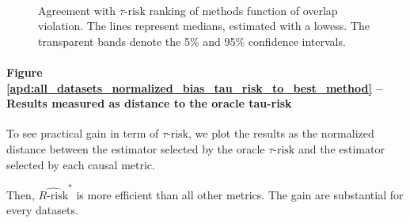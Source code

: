 \documentclass[french,12pt,twoside,a4paper]{book}
\begin{document}
\begin{appendices}
\begin{figure}
    \hfill
    \begin{subfigure}[b]{0.10\textwidth}
      ~
    \end{subfigure}
    \caption{Agreement with $\tau\text{-risk}$ ranking of methods function
      of overlap violation. The lines represent medians, estimated with a
      lowess. The transparent
      bands denote the 5\% and 95\% confidence intervals.}\label{apd:fig:all_datasets_tau_risk_ranking_agreement}
  \end{figure}



  \paragraph{Figure \ref{apd:all_datasets_normalized_bias_tau_risk_to_best_method}
    -- Results measured as distance to the oracle tau-risk}

  To see practical gain in term of $\tau\text{-risk}$, we plot the results as the
  normalized distance between the estimator selected by the oracle
  $\tau\text{-risk}$ and the estimator selected by each causal metric.

  Then, $\widehat{R\text{-risk}}^*$ is more efficient than all other metrics. The
  gain are substantial for every datasets.


\end{appendices}
\end{document}
